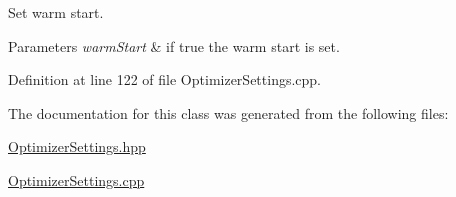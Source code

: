 Set warm start. 


\begin{DoxyParams}{Parameters}
{\em warm\+Start} & if true the warm start is set. \\
\hline
\end{DoxyParams}


Definition at line 122 of file Optimizer\+Settings.\+cpp.



The documentation for this class was generated from the following files\+:\begin{DoxyCompactItemize}
\item 
\hyperlink{OptimizerSettings_8hpp}{Optimizer\+Settings.\+hpp}\item 
\hyperlink{OptimizerSettings_8cpp}{Optimizer\+Settings.\+cpp}\end{DoxyCompactItemize}

